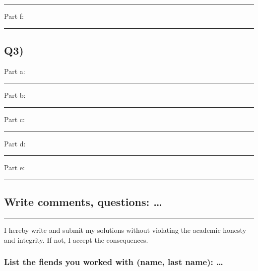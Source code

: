 \documentclass[
]{article}
\begin{document}
\begin{center}\rule{0.5\linewidth}{0.5pt}\end{center}

Part f:

\begin{center}\rule{0.5\linewidth}{0.5pt}\end{center}

\newpage

\hypertarget{q3}{%
\subsection{Q3)}\label{q3}}

Part a:

\begin{center}\rule{0.5\linewidth}{0.5pt}\end{center}

Part b:

\begin{center}\rule{0.5\linewidth}{0.5pt}\end{center}

Part c:

\begin{center}\rule{0.5\linewidth}{0.5pt}\end{center}

Part d:

\begin{center}\rule{0.5\linewidth}{0.5pt}\end{center}

Part e:

\begin{center}\rule{0.5\linewidth}{0.5pt}\end{center}

\newpage

\hypertarget{write-comments-questions}{%
\subsection{Write comments, questions:
\ldots{}}\label{write-comments-questions}}

\begin{center}\rule{0.5\linewidth}{0.5pt}\end{center}

I hereby write and submit my solutions without violating the academic
honesty and integrity. If not, I accept the consequences.

\hypertarget{list-the-fiends-you-worked-with-name-last-name}{%
\subsubsection{List the fiends you worked with (name, last name):
\ldots{}}\label{list-the-fiends-you-worked-with-name-last-name}}
\end{document}
